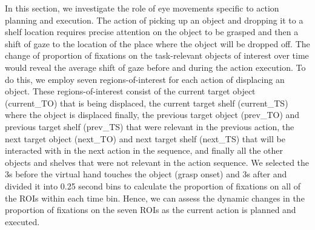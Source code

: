 In this section, we investigate the role of eye movements specific to action planning and execution. The action of picking up an object and dropping it to a shelf location requires precise attention on the object to be grasped and then a shift of gaze to the location of the place where the object will be dropped off. The change of proportion of fixations on the task-relevant objects of interest over time would reveal the average shift of gaze before and during the action execution. To do this, we employ seven regions-of-interest for each action of displacing an object. These regions-of-interest consist of the current target object (current\_TO) that is being displaced, the current target shelf (current\_TS) where the object is displaced finally, the previous target object (prev\_TO) and previous target shelf (prev\_TS) that were relevant in the previous action, the next target object (next\_TO) and next target shelf (next\_TS) that will be interacted with in the next action in the sequence, and finally all the other objects and shelves that were not relevant in the action sequence. We selected the 3s before the virtual hand touches the object (grasp onset) and 3s after and divided it into 0.25 second bins to calculate the proportion of fixations on all of the ROIs within each time bin. Hence, we can assess the dynamic changes in the proportion of fixations on the seven ROIs as the current action is planned and executed.

